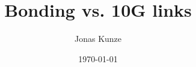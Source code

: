 
\usepackage[ngerman]{babel}
\usepackage{bibgerm}

\title{Bonding vs. 10G links}
\author{Jonas Kunze}
\date{\today}

\subject{Exp. Bestimmung der elektronischen Zustandsdichte von Spintronik Materialien}


  	\frame{\titlepage}
  	
 	
 	
